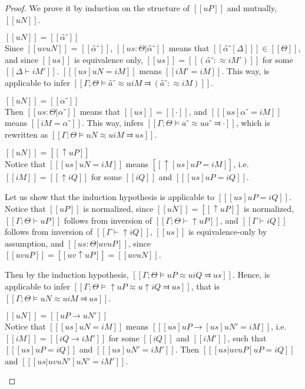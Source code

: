 \begin{proof}
    We prove it by induction on the structure of $[[uP]]$ and mutually, $[[uN]]$.
    \begin{caseof}
        \item $[[uN]] = [[α̂⁻]]$\\
            Since $[[uv uN]]$ = $[[α̂⁻]]$, 
            $[[us : Θ | {α̂⁻}]]$ means that $[[ α̂⁻[Δ] ]] \in [[Θ]]$, 
            and since $[[us]]$ is equivalence only, $[[us]] = [[ (α̂⁻ :≈ iM') ]]$
            for some $[[Δ ⊢ iM']]$.
            $[[ [us]uN = iM ]]$ means $[[iM' = iM]]$.
            This way,  is applicable to infer 
            $[[Γ ; Θ ⊨ â⁻ ≈u iM ⫤ (â⁻ :≈ iM)]]$.
        \item $[[uN]] = [[α⁻]]$\\
            Then $[[us : Θ | {α⁻}]]$ means that $[[ us ]] = [[·]]$, 
            and $[[ [us]α⁻ = iM ]]$ means $[[iM = α⁻]]$.
            This way,  infers 
            $[[Γ; Θ ⊨ a⁻ ≈u a⁻ ⫤ ·]]$, which is rewritten as $[[Γ; Θ ⊨ uN ≈u iM ⫤ us]]$.

        \item $[[uN]] = [[↑uP]]$\\
            Notice that $[[ [us]uN = iM ]]$ means $[[ ↑[us]uP = iM ]]$, i.e.
            $[[iM]] = [[↑iQ]]$ for some $[[iQ]]$ and $[[ [us]uP = iQ ]]$.

            Let us show that the induction hypothesis is applicable to $[[ [us]uP = iQ ]]$.
            Notice that $[[uP]]$ is normalized, since $[[uN]] = [[↑uP]]$ is normalized,
            $[[Γ ; Θ ⊢ uP]]$ follows from inversion of $[[Γ ; Θ ⊢ ↑uP]]$, 
            and $[[Γ ⊢ iQ]]$ follows from inversion of $[[Γ ⊢ ↑iQ]]$,
            $[[us]]$ is equivalence-only by assumption, and
            $[[us : Θ | uv uP]]$, since $[[uv uP]] = [[uv ↑uP]] = [[uv uN]]$.       

            Then by the induction hypothesis, $[[Γ ; Θ ⊨ uP ≈u iQ ⫤ us]]$.
            Hence,  is applicable to infer
            $[[Γ ; Θ ⊨ ↑uP ≈u ↑iQ ⫤ us]]$, that is $[[Γ ; Θ ⊨ uN ≈u iM ⫤ us]]$.

        \item $[[uN]] = [[uP → uN']]$\\
            Notice that $[[ [us]uN = iM ]]$ means $[[ [us]uP → [us]uN' = iM ]]$, i.e.
            $[[iM]] = [[iQ → iM']]$ for some $[[iQ]]$ and $[[iM']]$, 
            such that $[[ [us]uP = iQ ]]$ and $[[ [us]uN' = iM' ]]$.
            Then $[[ [us | uv uP]uP = iQ ]]$ and $[[ [us | uv uN']uN' = iM' ]]$.


\end{caseof}
\end{proof}
